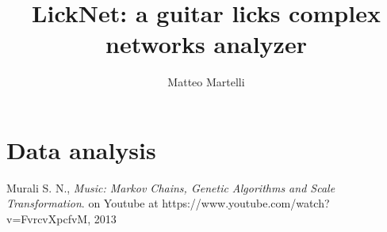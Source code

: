 \documentclass[a4paper,10pt]{paper}
\title{LickNet: a guitar licks complex networks analyzer}
\author{Matteo Martelli}
\begin{document}
\maketitle

\section{Data analysis}


\begin{thebibliography}{50}
   Murali S. N., \textsl{Music: Markov Chains, Genetic Algorithms and Scale Transformation}.
		on Youtube at https://www.youtube.com/watch?v=FvrcvXpcfvM, 2013
\end{thebibliography}
\end{document}
